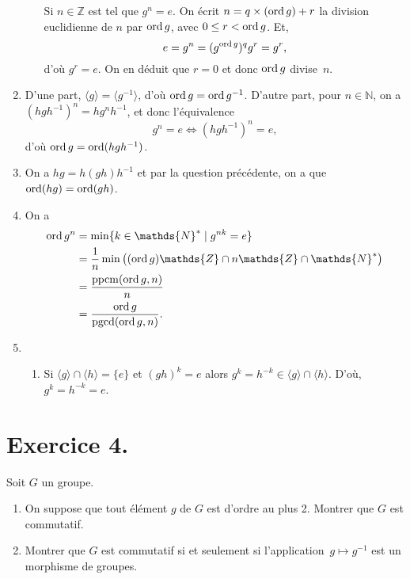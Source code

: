 \documentclass[./main]{subfiles}
\begin{document}
\begin{enumerate}
\begin{enumerate}
          Si  $n \in \mathds{Z}$ est tel que $g^n = e$. On écrit $n = q \times (\operatorname{ord} g) + r$ la division euclidienne de $n$ par $\operatorname{ord} g$, avec $0 \le r < \operatorname{ord} g$.
          Et, \[
          e = g^n = (g^{\operatorname{ord} g})^q g^r = g^r
          ,\]
          d'où $g^r = e$.
          On en déduit que  $r = 0$ et donc $\operatorname{ord} g$ divise~$n$.
      \end{enumerate}
    \item D'une part, $\langle g \rangle = \langle g^{-1} \rangle$, d'où $\operatorname{ord} g = \operatorname{ord} g^{-1}$.
      D'autre part, pour $n \in \mathds{N}$, on a $(hgh^{-1})^n = h g^n h^{-1}$, et donc l'équivalence \[
      g^n = e \iff (h g h^{-1})^n = e 
      ,\] d'où $\operatorname{ord} g = \operatorname{ord}(h g h^{-1})$.
    \item On a $hg = h (gh) h^{-1}$ et par la question précédente, on a que $\operatorname{ord}(hg) = \operatorname{ord}(gh)$.
    \item On a 
      \begin{align*}
        \ord g^n &= \min\{k \in \mathds{N}^*  \mid g^{nk} = e\}\\
                 &= \frac{1}{n} \min \big((\ord g) \mathds{Z} \cap n \mathds{Z} \cap \mathds{N}^*\big)\\
                 &= \frac{\operatorname{ppcm}(\ord g, n)}{n} \\
                 &= \frac{\ord g}{\operatorname{pgcd}(\ord g, n)} 
      .\end{align*}
    \item 
      \begin{enumerate}
        \item Si $\langle g \rangle \cap \langle h\rangle = \{e\}$ et $(gh)^k = e$ alors $g^k = h^{-k} \in \langle g \rangle \cap \langle h \rangle$.
          D'où, $g^k = h^{-k} = e$.
      \end{enumerate}
  \end{enumerate}

  \section{Exercice 4.}
  
  \begin{enonce}
    Soit $G$ un groupe.
    \begin{enumerate}
      \item On suppose que tout élément $g$ de $G$ est d'ordre au plus 2. Montrer que $G$ est commutatif.
      \item Montrer que $G$ est commutatif si et seulement si l'application~$g \mapsto g^{-1}$ est un morphisme de groupes.
    \end{enumerate}
  \end{enonce}
\end{document}

